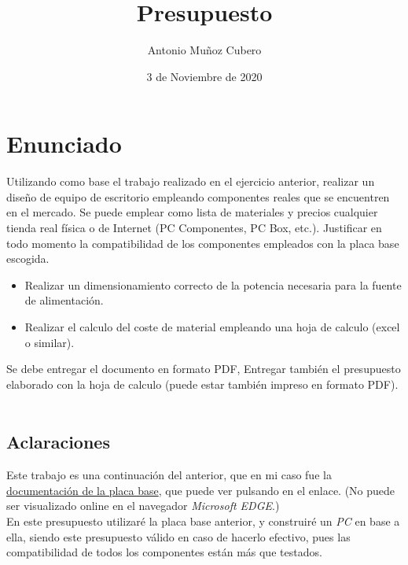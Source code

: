 \documentclass{article}
\title{Presupuesto}
\author{Antonio Muñoz Cubero}
\date{3 de Noviembre de 2020}
\begin{document}
  \maketitle
  \pagestyle{fancy}
  
  \newpage
    \tableofcontents
  
  \newpage

  \newpage
    \section{Enunciado}
      Utilizando como base el trabajo realizado en el ejercicio anterior, realizar un diseño de equipo de escritorio empleando componentes reales que se encuentren en el mercado. Se puede emplear como lista de materiales 
      y precios cualquier tienda real física o de Internet (PC Componentes, PC Box, etc.). Justificar en todo momento la compatibilidad de los componentes empleados con la placa base escogida.
      \begin{itemize}
        \item Realizar un dimensionamiento correcto de la potencia necesaria para la fuente de alimentación.
        \item Realizar el calculo del coste de material empleando una hoja de calculo (excel o similar).
      \end{itemize}
      Se debe entregar el documento en formato PDF, Entregar también el presupuesto elaborado con la hoja de calculo (puede estar también impreso en formato PDF).
      \\\\
      \subsection{Aclaraciones}
      Este trabajo es una continuación del anterior, que en mi caso fue la \href{https://github.com/ErTonix12/DAM/blob/main/1%C2%BA/SI/Placa_Base_Documentaci%C3%B3n/build/Placa_Base_Documentacion.pdf}{documentación de la 
      placa base}, que puede ver pulsando en el enlace. (No puede ser visualizado online en el navegador \textit{Microsoft EDGE}.)
      \\
      En este presupuesto utilizaré la placa base anterior, y construiré un \textit{PC} en base a ella, siendo este presupuesto válido en caso de hacerlo efectivo, pues las compatibilidad de todos los componentes están más
       que testados.
  \newpage
\end{document}
